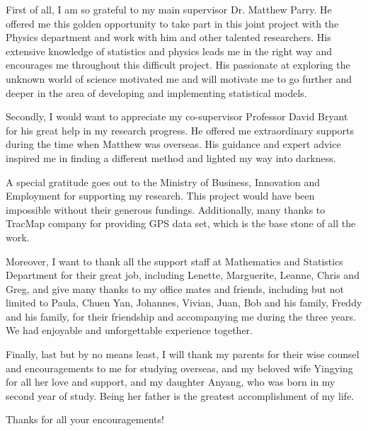 First of all, I am so grateful to my main supervisor Dr. Matthew Parry. He offered me this golden opportunity to take part in this joint project with the Physics department and work with him and other talented researchers. His extensive knowledge of statistics and physics leads me in the right way and encourages me throughout this difficult project. His passionate at exploring the unknown world of science motivated me and will motivate me to go further and deeper in the area of developing and implementing statistical models.  

Secondly, I would want to appreciate my co-supervisor Professor David Bryant for his great help in my research progress. He offered me extraordinary supports during the time when Matthew was overseas. His guidance and expert advice inspired me in finding a different method and lighted my way into darkness. 

A special gratitude goes out to the Ministry of Business, Innovation and Employment for supporting my research. This project would have been impossible without their generous fundings. Additionally, many thanks to TracMap company for providing GPS data set, which is the base stone of all the work. 

Moreover, I want to thank all the support staff at Mathematics and Statistics Department for their great job, including Lenette, Marguerite, Leanne, Chris and Greg, and give many thanks to my office mates and friends, including but not limited to Paula, Chuen Yan, Johannes, Vivian, Juan, Bob and his family, Freddy and his family, for their friendship and accompanying me during the three years. We had enjoyable and unforgettable experience together. 

Finally, last but by no means least, I will thank my parents for their wise counsel and encouragements to me for studying overseas, and my beloved wife Yingying for all her love and support, and my daughter Anyang, who was born in my second year of study. Being her father is the greatest accomplishment of my life.

Thanks for all your encouragements! 

